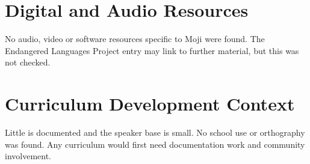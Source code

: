 \documentclass[12pt]{article}
\begin{document}
\section{Digital and Audio Resources}
No audio, video or software resources specific to Moji were found. The Endangered Languages Project entry may link to further material, but this was not checked.

\section{Curriculum Development Context}
Little is documented and the speaker base is small. No school use or orthography was found. Any curriculum would first need documentation work and community involvement.
\end{document}
